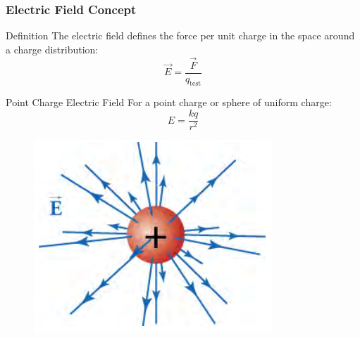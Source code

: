 \documentclass{beamer}
\begin{document}
\begin{frame}
    \frametitle{Electric Field Concept}
    \begin{block}{Definition}
        The electric field defines the force per unit charge in the space around a charge distribution:
        \begin{equation}
            \vec{E} = \frac{\vec{F}}{q_{\text{test}}}
        \end{equation}
    \end{block}
    
    \begin{block}{Point Charge Electric Field}
        For a point charge or sphere of uniform charge:
        \begin{equation}
            E = \frac{kq}{r^2}
        \end{equation}
    \end{block}
    \end{frame}

\begin{frame}
    
        \begin{figure}
            \centering
            \includegraphics[width=0.8\linewidth]{phys11-electrostatics-electric-field-point-charge.png}
        \end{figure}
    
\end{frame}
\end{document}
